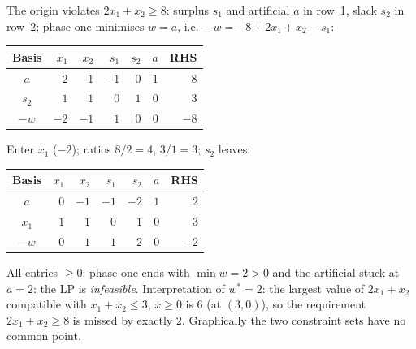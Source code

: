 \begin{solutions}
  \item The origin violates $2x_1+x_2\ge 8$: surplus $s_1$ and artificial
        $a$ in row~1, slack $s_2$ in row~2; phase one minimises $w=a$,
        i.e.\ $-w=-8+2x_1+x_2-s_1$:
        \begin{center}
        \begin{tabular}{c|rrrrr|r}
        \hline
        Basis & $x_1$ & $x_2$ & $s_1$ & $s_2$ & $a$ & RHS\\
        \hline
        $a$   & $2$ & $1$ & $-1$ & $0$ & $1$ & $8$\\
        $s_2$ & $1$ & $1$ & $0$ & $1$ & $0$ & $3$\\
        \hline
        $-w$ & $-2$ & $-1$ & $1$ & $0$ & $0$ & $-8$\\
        \hline
        \end{tabular}
        \end{center}
        Enter $x_1$ ($-2$); ratios $8/2=4$, $3/1=3$; $s_2$ leaves:
        \begin{center}
        \begin{tabular}{c|rrrrr|r}
        \hline
        Basis & $x_1$ & $x_2$ & $s_1$ & $s_2$ & $a$ & RHS\\
        \hline
        $a$   & $0$ & $-1$ & $-1$ & $-2$ & $1$ & $2$\\
        $x_1$ & $1$ & $1$ & $0$ & $1$ & $0$ & $3$\\
        \hline
        $-w$ & $0$ & $1$ & $1$ & $2$ & $0$ & $-2$\\
        \hline
        \end{tabular}
        \end{center}
        All entries $\ge 0$: phase one ends with $\min w=2>0$ and the
        artificial stuck at $a=2$: the LP is \emph{infeasible}.
        Interpretation of $w^{*}=2$: the largest value of $2x_1+x_2$
        compatible with $x_1+x_2\le 3$, $x\ge 0$ is $6$ (at $(3,0)$), so
        the requirement $2x_1+x_2\ge 8$ is missed by exactly $2$.
        Graphically the two constraint sets have no common point.


\end{solutions}
